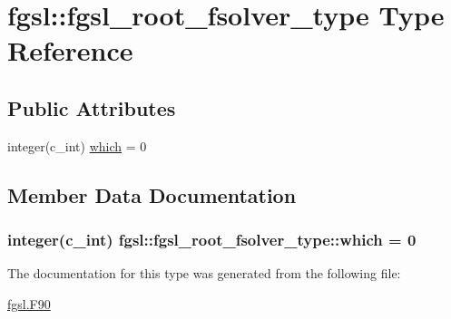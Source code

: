 \hypertarget{structfgsl_1_1fgsl__root__fsolver__type}{}\section{fgsl\+:\+:fgsl\+\_\+root\+\_\+fsolver\+\_\+type Type Reference}
\label{structfgsl_1_1fgsl__root__fsolver__type}
\subsection*{Public Attributes}
\begin{DoxyCompactItemize}
\item 
integer(c\+\_\+int) \hyperlink{structfgsl_1_1fgsl__root__fsolver__type_a501d75f08ad98d21274d2b56212b8610}{which} = 0
\end{DoxyCompactItemize}


\subsection{Member Data Documentation}
\hypertarget{structfgsl_1_1fgsl__root__fsolver__type_a501d75f08ad98d21274d2b56212b8610}{}
\subsubsection[{which}]{\setlength{\rightskip}{0pt plus 5cm}integer(c\+\_\+int) fgsl\+::fgsl\+\_\+root\+\_\+fsolver\+\_\+type\+::which = 0}\label{structfgsl_1_1fgsl__root__fsolver__type_a501d75f08ad98d21274d2b56212b8610}


The documentation for this type was generated from the following file\+:\begin{DoxyCompactItemize}
\item 
\hyperlink{fgsl_8F90}{fgsl.\+F90}\end{DoxyCompactItemize}

